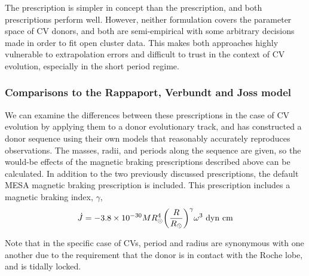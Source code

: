 The \citet{garraffo2018a} prescription is simpler in concept than the \citet{matt2015} prescription, and both prescriptions perform well. However, neither formulation covers the parameter space of CV donors, and both are semi-empirical with some arbitrary decisions made in order to fit open cluster data. This makes both approaches highly vulnerable to extrapolation errors and difficult to trust in the context of CV evolution, especially in the short period regime.


\subsubsection{Comparisons to the Rappaport, Verbundt and Joss model}

We can examine the differences between these prescriptions in the case of CV evolution by applying them to a donor evolutionary track, and \citet{knigge11} has constructed a donor sequence using their own models that reasonably accurately reproduces observations. The masses, radii, and periods along the sequence are given, so the would-be effects of the magnetic braking prescriptions described above can be calculated. In addition to the two previously discussed prescriptions, the default MESA \citep{Paxton_2015} magnetic braking prescription \citep{rappaport1983} is included. This prescription includes a magnetic braking index, $\gamma$,
\begin{equation}
    \dot J = -3.8\times10^{-30} M R_\odot^4 \bigg( \frac{R}{R_\odot} \bigg)^\gamma \omega^3\  {\rm dyn\ cm}
\end{equation}

Note that in the specific case of CVs, period and radius are synonymous with one another due to the requirement that the donor is in contact with the Roche lobe, and is tidally locked. 

